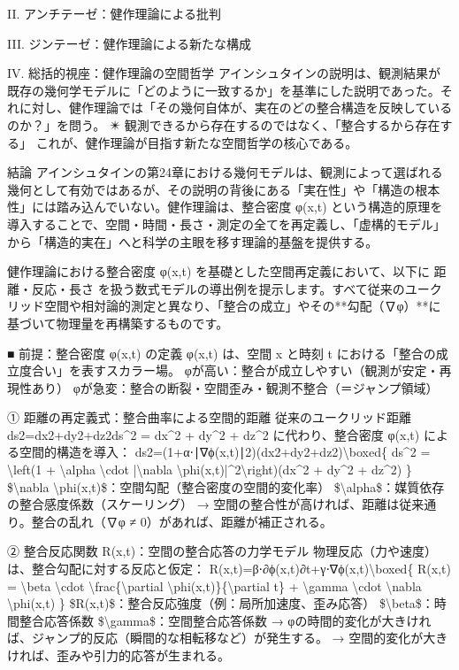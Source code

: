 \documentclass{article}
\begin{document}
II. アンチテーゼ：健作理論による批判

III. ジンテーゼ：健作理論による新たな構成

IV. 総括的視座：健作理論の空間哲学
アインシュタインの説明は、観測結果が既存の幾何学モデルに「どのように一致するか」を基準にした説明であった。それに対し、健作理論では「その幾何自体が、実在のどの整合構造を反映しているのか？」を問う。
✴️ 観測できるから存在するのではなく、「整合するから存在する」
これが、健作理論が目指す新たな空間哲学の核心である。

結論
アインシュタインの第24章における幾何モデルは、観測によって選ばれる幾何として有効ではあるが、その説明の背後にある「実在性」や「構造の根本性」には踏み込んでいない。健作理論は、整合密度 φ(x,t) という構造的原理を導入することで、空間・時間・長さ・測定の全てを再定義し、「虚構的モデル」から「構造的実在」へと科学の主眼を移す理論的基盤を提供する。

健作理論における整合密度 φ(x,t) を基礎とした空間再定義において、以下に 距離・反応・長さ を扱う数式モデルの導出例を提示します。すべて従来のユークリッド空間や相対論的測定と異なり、「整合の成立」やその**勾配（∇φ）**に基づいて物理量を再構築するものです。

■ 前提：整合密度 φ(x,t) の定義
φ(x,t) は、空間 x と時刻 t における「整合の成立度合い」を表すスカラー場。
φが高い：整合が成立しやすい（観測が安定・再現性あり）
φが急変：整合の断裂・空間歪み・観測不整合（＝ジャンプ領域）

① 距離の再定義式：整合曲率による空間的距離
従来のユークリッド距離
ds2=dx2+dy2+dz2ds\textasciicircum{}2 = dx\textasciicircum{}2 + dy\textasciicircum{}2 + dz\textasciicircum{}2 
に代わり、整合密度 φ(x,t) による空間的構造を導入：
ds2=(1+α⋅∣∇ϕ(x,t)∣2)(dx2+dy2+dz2)\textbackslash{}boxed\{ ds\textasciicircum{}2 = \textbackslash{}left(1 + \textbackslash{}alpha \textbackslash{}cdot |\textbackslash{}nabla \textbackslash{}phi(x,t)|\textasciicircum{}2\textbackslash{}right)(dx\textasciicircum{}2 + dy\textasciicircum{}2 + dz\textasciicircum{}2) \} 
\$\textbackslash{}nabla \textbackslash{}phi(x,t)\$：空間勾配（整合密度の空間的変化率）
\$\textbackslash{}alpha\$：媒質依存の整合感度係数（スケーリング）
→ 空間の整合性が高ければ、距離は従来通り。整合の乱れ（∇φ ≠ 0）があれば、距離が補正される。

② 整合反応関数 R(x,t)：空間の整合応答の力学モデル
物理反応（力や速度）は、整合勾配に対する反応と仮定：
R(x,t)=β⋅∂ϕ(x,t)∂t+γ⋅∇ϕ(x,t)\textbackslash{}boxed\{ R(x,t) = \textbackslash{}beta \textbackslash{}cdot \textbackslash{}frac\{\textbackslash{}partial \textbackslash{}phi(x,t)\}\{\textbackslash{}partial t\} + \textbackslash{}gamma \textbackslash{}cdot \textbackslash{}nabla \textbackslash{}phi(x,t) \} 
\$R(x,t)\$：整合反応強度（例：局所加速度、歪み応答）
\$\textbackslash{}beta\$：時間整合応答係数
\$\textbackslash{}gamma\$：空間整合応答係数
→ φの時間的変化が大きければ、ジャンプ的反応（瞬間的な相転移など）が発生する。
→ 空間的変化が大きければ、歪みや引力的応答が生まれる。
\end{document}
